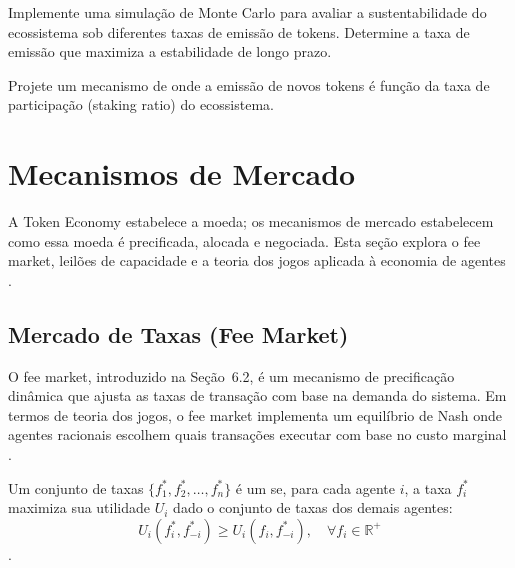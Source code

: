 \begin{exercicio}
Implemente uma simulação de Monte Carlo para avaliar a
sustentabilidade do ecossistema sob diferentes taxas de emissão
de tokens. Determine a taxa de emissão que maximiza a
estabilidade de longo prazo.
\end{exercicio}

\begin{exercicio}
Projete um mecanismo de  onde
a emissão de novos tokens é função da taxa de participação
(staking ratio) do ecossistema.
\end{exercicio}

\section{Mecanismos de Mercado}
\label{sec:mecanismos-mercado}
\nivelavancado

A Token Economy estabelece a moeda; os mecanismos de mercado
estabelecem como essa moeda é precificada, alocada e negociada.
Esta seção explora o fee market, leilões de capacidade e a teoria
dos jogos aplicada à economia de agentes \cite{opencode2026token,
nash1950equilibrium, vonneumann1944theory}.

\subsection{Mercado de Taxas (Fee Market)}

O fee market, introduzido na Seção~6.2, é um mecanismo de
precificação dinâmica que ajusta as taxas de transação com base
na demanda do sistema. Em termos de teoria dos jogos, o fee market
implementa um equilíbrio de Nash onde agentes racionais escolhem
quais transações executar com base no custo marginal
\cite{nash1950equilibrium, shoham2023multiagent}.

\begin{definicao}
Um conjunto de taxas $\{f_1^*, f_2^*, \ldots, f_n^*\}$ é um
 se, para cada agente $i$,
a taxa $f_i^*$ maximiza sua utilidade $U_i$ dado o conjunto de
taxas dos demais agentes:
\[
U_i(f_i^*, f_{-i}^*) \geq U_i(f_i, f_{-i}^*),
\quad \forall f_i \in \mathbb{R}^+
\]
\cite{nash1950equilibrium}.
\end{definicao}

